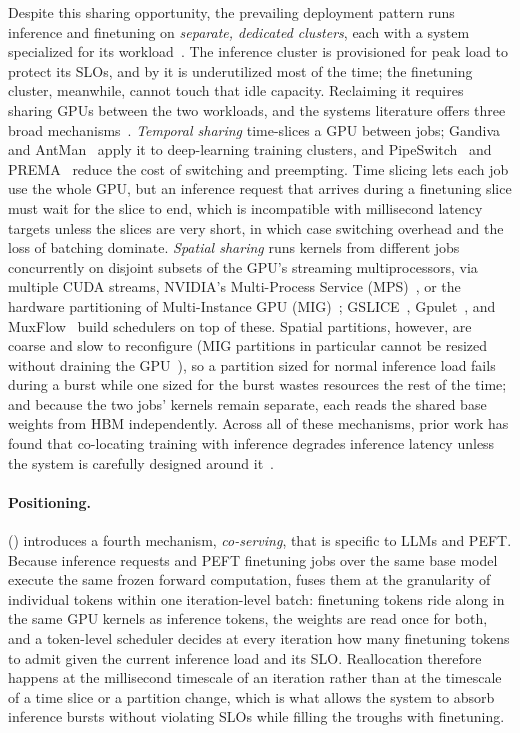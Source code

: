 Despite this sharing opportunity, the prevailing deployment pattern runs inference and finetuning on \emph{separate, dedicated clusters}, each with a system specialized for its workload~\cite{weng2022mlaas,gao2022deep,chen2023deepboot}.
The inference cluster is provisioned for peak load to protect its SLOs, and by  it is underutilized most of the time; the finetuning cluster, meanwhile, cannot touch that idle capacity.
Reclaiming it requires sharing GPUs between the two workloads, and the systems literature offers three broad mechanisms~\cite{yu2022survey}.
\emph{Temporal sharing} time-slices a GPU between jobs; Gandiva~\cite{xiao2018gandiva} and AntMan~\cite{xiao2020antman} apply it to deep-learning training clusters, and PipeSwitch~\cite{bai2020pipeswitch} and PREMA~\cite{choi2020prema} reduce the cost of switching and preempting.
Time slicing lets each job use the whole GPU, but an inference request that arrives during a finetuning slice must wait for the slice to end, which is incompatible with millisecond latency targets unless the slices are very short, in which case switching overhead and the loss of batching dominate.
\emph{Spatial sharing} runs kernels from different jobs concurrently on disjoint subsets of the GPU's streaming multiprocessors, via multiple CUDA streams, NVIDIA's Multi-Process Service (MPS)~\cite{mps}, or the hardware partitioning of Multi-Instance GPU (MIG)~\cite{mig}; GSLICE~\cite{dhakal2020gslice}, Gpulet~\cite{choi2022serving}, and MuxFlow~\cite{zhao2023muxflow} build schedulers on top of these.
Spatial partitions, however, are coarse and slow to reconfigure (MIG partitions in particular cannot be resized without draining the GPU~\cite{migpartition}), so a partition sized for normal inference load fails during a burst while one sized for the burst wastes resources the rest of the time; and because the two jobs' kernels remain separate, each reads the shared base weights from HBM independently.
Across all of these mechanisms, prior work has found that co-locating training with inference degrades inference latency unless the system is carefully designed around it~\cite{romero2021infaas,choi2022serving}.

\paragraph{Positioning.}
\FlexLLM () introduces a fourth mechanism, \emph{co-serving}, that is specific to LLMs and PEFT.
Because inference requests and PEFT finetuning jobs over the same base model execute the same frozen forward computation, \FlexLLM fuses them at the granularity of individual tokens within one iteration-level batch: finetuning tokens ride along in the same GPU kernels as inference tokens, the weights are read once for both, and a token-level scheduler decides at every iteration how many finetuning tokens to admit given the current inference load and its SLO.
Reallocation therefore happens at the millisecond timescale of an iteration rather than at the timescale of a time slice or a partition change, which is what allows the system to absorb inference bursts without violating SLOs while filling the troughs with finetuning.


